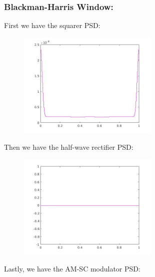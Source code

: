 \documentclass[a4paper,11pt]{article}
\begin{document}
\newpage

\subsubsection{Blackman-Harris Window:}

First we have the squarer PSD:
\begin{figure}[!hp]
    \begin{center}
    \includegraphics[width=0.6\textwidth]{images/lab3_30.jpg}
    \end{center}
\end{figure}

Then we have the half-wave rectifier PSD:

\begin{figure}[!hp]
    \begin{center}
    \includegraphics[width=0.6\textwidth]{images/lab3_40.jpg}
    \end{center}
\end{figure}

\newpage

Lastly, we have the AM-SC modulator PSD:
\end{document}
